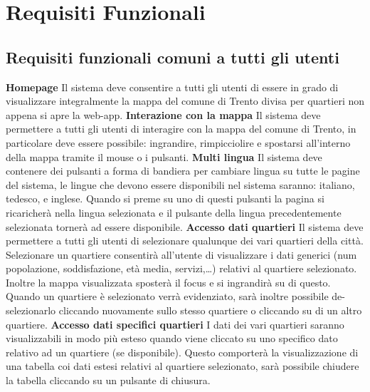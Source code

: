 \chapter{Requisiti Funzionali} 
    \section{Requisiti funzionali comuni a tutti gli utenti}
        \begin{rfList}
            \rfItem \textbf{Homepage} Il sistema deve consentire a tutti gli utenti di essere in grado di visualizzare integralmente la mappa del comune di Trento divisa per quartieri non appena si apre la web-app.
            \rfItem \textbf{Interazione con la mappa} Il sistema deve permettere a tutti gli utenti di interagire con la mappa del comune di Trento, in particolare deve essere possibile: ingrandire, rimpicciolire e spostarsi all'interno della mappa tramite il mouse o i pulsanti.
            \rfItem \textbf{Multi lingua} Il sistema deve contenere dei pulsanti a forma di bandiera per cambiare lingua su tutte le pagine del sistema, le lingue che devono essere disponibili nel sistema saranno: italiano, tedesco, e inglese. Quando si preme su uno di questi pulsanti la pagina si ricaricherà nella lingua selezionata e il pulsante della lingua precedentemente selezionata tornerà ad essere disponibile.
            \rfItem \textbf{Accesso dati quartieri} Il sistema deve permettere a tutti gli utenti di selezionare qualunque dei vari quartieri della città. Selezionare un quartiere consentirà all'utente di visualizzare i dati generici (num popolazione, soddisfazione, età media, servizi,\dots) relativi al quartiere selezionato. Inoltre la mappa visualizzata sposterà il focus e si ingrandirà su di questo. Quando un quartiere è selezionato verrà evidenziato, sarà inoltre possibile de-selezionarlo cliccando nuovamente sullo stesso quartiere o cliccando su di un altro quartiere.
            \rfItem \textbf{Accesso dati specifici quartieri} I dati dei vari quartieri saranno visualizzabili in modo più esteso quando viene cliccato su uno specifico dato relativo ad un quartiere (se disponibile). Questo comporterà la visualizzazione di una tabella coi dati estesi relativi al quartiere selezionato, sarà possibile chiudere la tabella cliccando su un pulsante di chiusura. 
        \end{rfList} 
